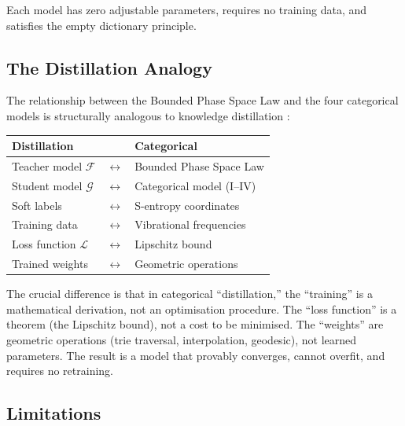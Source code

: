 \documentclass[11pt,twocolumn,a4paper]{article}
\theoremstyle{definition}
\theoremstyle{remark}
\newcommand{\Teacher}{\mathcal{F}}
\newcommand{\Student}{\mathcal{G}}
\newcommand{\Loss}{\mathcal{L}}
\begin{document}
Each model has zero adjustable parameters, requires no training data, and satisfies the empty dictionary principle.

\subsection{The Distillation Analogy}

The relationship between the Bounded Phase Space Law and the four categorical models is structurally analogous to knowledge distillation \citep{hinton2015}:

\begin{center}
\begin{tabular}{lcl}
\textbf{Distillation} & & \textbf{Categorical} \\
\midrule
Teacher model $\Teacher$ & $\leftrightarrow$ & Bounded Phase Space Law \\
Student model $\Student$ & $\leftrightarrow$ & Categorical model (I--IV) \\
Soft labels & $\leftrightarrow$ & S-entropy coordinates \\
Training data & $\leftrightarrow$ & Vibrational frequencies \\
Loss function $\Loss$ & $\leftrightarrow$ & Lipschitz bound \\
Trained weights & $\leftrightarrow$ & Geometric operations \\
\end{tabular}
\end{center}

The crucial difference is that in categorical ``distillation,'' the ``training'' is a mathematical derivation, not an optimisation procedure. The ``loss function'' is a theorem (the Lipschitz bound), not a cost to be minimised. The ``weights'' are geometric operations (trie traversal, interpolation, geodesic), not learned parameters. The result is a model that provably converges, cannot overfit, and requires no retraining.

\subsection{Limitations}
\end{document}
